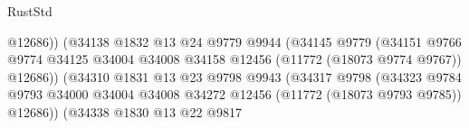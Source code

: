 \begin{lexlean}{RustStd}
\begin{coremodule}
                                                      @12686))
                                                  (@34138
                                                    @1832
                                                    @13
                                                    @24
                                                    @9779
                                                    @9944
                                                    (@34145
                                                      @9779
                                                      (@34151
                                                        @9766
                                                        @9774
                                                        @34125
                                                        @34004
                                                        @34008
                                                        @34158
                                                        @12456
                                                        (@11772 (@18073 @9774 @9767))
                                                        @12686))
                                                    (@34310
                                                      @1831
                                                      @13
                                                      @23
                                                      @9798
                                                      @9943
                                                      (@34317
                                                        @9798
                                                        (@34323
                                                          @9784
                                                          @9793
                                                          @34000
                                                          @34004
                                                          @34008
                                                          @34272
                                                          @12456
                                                          (@11772 (@18073 @9793 @9785))
                                                          @12686))
                                                      (@34338
                                                        @1830
                                                        @13
                                                        @22
                                                        @9817

\end{coremodule}
\end{lexlean}
